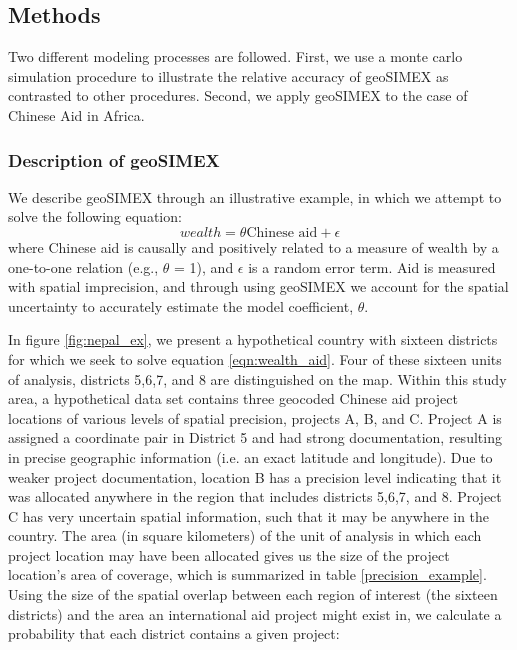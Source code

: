 \subsection{Methods}
Two different modeling processes are followed.  First, we use a monte carlo simulation procedure to illustrate the relative accuracy of geoSIMEX as contrasted to other procedures.  Second, we apply geoSIMEX to the case of Chinese Aid in Africa.

\subsubsection{Description of geoSIMEX}
We describe geoSIMEX through an illustrative example, in which we attempt to solve the following equation:
\begin{equation}
wealth = \theta \text{Chinese aid} + \epsilon
\label{eqn:wealth_aid}
\end{equation}
where Chinese aid is causally and positively related to a measure of wealth by a one-to-one relation (e.g., $\theta$ = 1), and $\epsilon$ is a random error term. 
Aid is measured with spatial imprecision, and through using geoSIMEX we account for the spatial uncertainty to accurately estimate the model coefficient, $\theta$. 
\par
In figure \ref{fig:nepal_ex}, we present a hypothetical country with sixteen districts for which we seek to solve equation \ref{eqn:wealth_aid}. 
Four of these sixteen units of analysis, districts 5,6,7, and 8 are distinguished on the map. 
Within this study area, a hypothetical data set contains three geocoded Chinese aid project locations of various levels of spatial precision, projects A, B, and C. 
Project A is assigned a coordinate pair in District 5 and had strong documentation, resulting
in precise geographic information (i.e. an exact latitude and longitude). 
Due to weaker project documentation, location B has a precision level indicating that it was allocated
anywhere in the region that includes districts 5,6,7, and 8. 
Project C has very uncertain spatial information, such that it may be anywhere in the country. 
The area (in square kilometers) of the unit of analysis in which each project location may have been allocated gives us the size of the project location’s area of coverage, which is summarized in table \ref{precision_example}.
Using the size of the spatial overlap between each region of interest (the sixteen districts) and the area an international aid project might exist in, we calculate a probability that each district contains a given project:


